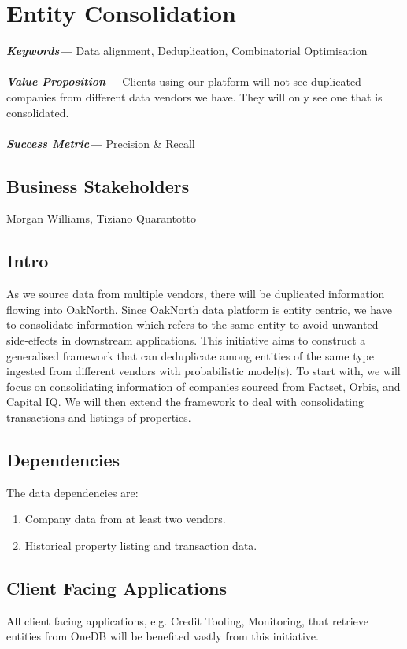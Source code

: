 \documentclass[]{article}
\providecommand{\keywords}[1]{\textbf{\textit{Keywords---}} #1}
\providecommand{\values}[1]{\textbf{\textit{Value Proposition---}} #1}
\providecommand{\successmetric}[1]{\textbf{\textit{Success Metric---}} #1}
\begin{document}
\newpage

\section{Entity Consolidation}
\keywords{Data alignment, Deduplication, Combinatorial Optimisation}
\\\\
\noindent
\values{Clients using our platform will not see duplicated companies from 
different data vendors we have. They will only see one that is consolidated.}
\\\\
\noindent
\successmetric{Precision \& Recall}
\subsection{Business Stakeholders}
Morgan Williams, Tiziano Quarantotto 

\subsection{Intro}
As we source data from multiple vendors, there will be duplicated information 
flowing into OakNorth. Since OakNorth data platform is entity centric, we have 
to consolidate information which refers to the same entity to avoid unwanted 
side-effects in downstream applications. This initiative aims to construct a 
generalised framework that can deduplicate among entities of the same type 
ingested from different vendors with probabilistic model(s). To start with, we 
will focus on consolidating information of companies sourced from Factset, 
Orbis, and Capital IQ. We will then extend the framework to deal with 
consolidating transactions and listings of properties.

\subsection{Dependencies}
The data dependencies are:

\begin{enumerate}
    \item Company data from at least two vendors.
    \item Historical property listing and transaction data.
\end{enumerate}

\subsection{Client Facing Applications}
All client facing applications, e.g. Credit Tooling, Monitoring, that retrieve 
entities from OneDB will be benefited vastly from this initiative.
\end{document}
